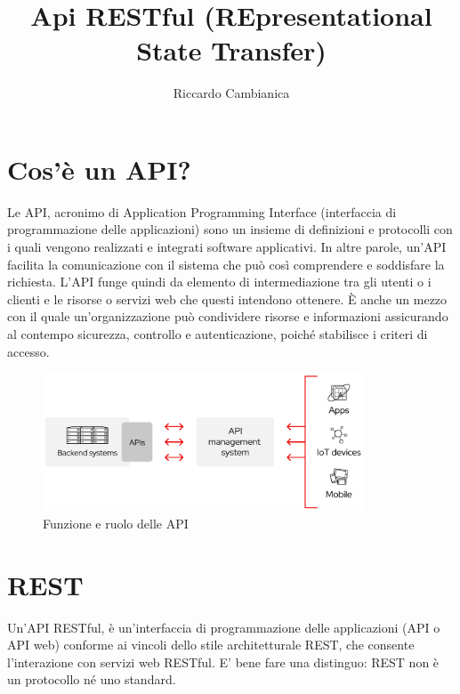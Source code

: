 \documentclass{article}
\title{Api RESTful (REpresentational State Transfer)}
\author{Riccardo Cambianica}
\begin{document}
    \maketitle
     \newpage
     \tableofcontents
     \newpage
     \section{Cos'è un API?}
         Le API, acronimo di Application Programming Interface (interfaccia di programmazione delle applicazioni) sono un insieme di definizioni e protocolli con i quali vengono realizzati e integrati software applicativi. In altre parole, un'API facilita la comunicazione con il sistema che può così comprendere e soddisfare la richiesta. L'API funge quindi da elemento di intermediazione tra gli utenti o i clienti e le risorse o servizi web che questi intendono ottenere. È anche un mezzo con il quale un'organizzazione può condividere risorse e informazioni assicurando al contempo sicurezza, controllo e autenticazione, poiché stabilisce i criteri di accesso.
         \begin{figure}[htbp]
             \centering
             \includegraphics[width=0.85\textwidth]{figures/API-page-graphic.png}  
             \caption{Funzione e ruolo delle API}
             \label{fig:api}
         \end{figure}
     \section{REST}
        Un'API RESTful, è un'interfaccia di programmazione delle applicazioni (API o API web) conforme ai vincoli dello stile architetturale REST, che consente l'interazione con servizi web RESTful. E' bene fare una distinguo: REST non è un protocollo né uno standard.
        
\end{document}
